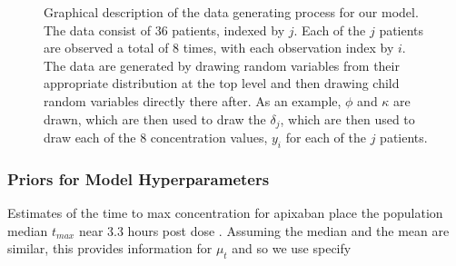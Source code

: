 \begin{figure}[h!]
	\centering
	
	
	\caption{Graphical description of the data generating process for our model.  The data consist of 36 patients, indexed by $j$.  Each of the $j$ patients are observed a total of 8 times, with each observation index by $i$.  The data are generated by drawing random variables from their appropriate distribution at the top level and then drawing child random variables directly there after.  As an example, $\phi$ and $\kappa$ are drawn, which are then used to draw the $\delta_j$, which are then used to draw each of the 8 concentration values, $y_i$ for each of the $j$ patients.}
	\label{net}
\end{figure}

\subsubsection*{Priors for Model Hyperparameters}

Estimates of the time to max concentration for apixaban place the population median $t_{\mathit{max}}$ near 3.3 hours post dose  \cite{Byon2019-gf}. Assuming the median and the mean are similar, this provides information for $\mu_t$ and so we use specify 

